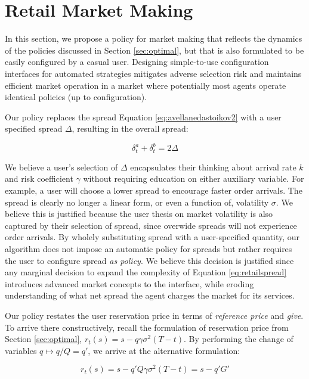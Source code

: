 \documentclass{article}
\begin{document}
\section{Retail Market Making}
\label{sec:retail}

In this section, we propose a policy for market making that reflects the dynamics of the policies discussed in Section \ref{sec:optimal}, but that is also formulated to be easily configured by a casual user. Designing simple-to-use configuration interfaces for automated strategies mitigates adverse selection risk and maintains efficient market operation in a market where potentially most agents operate identical policies (up to configuration).

Our policy replaces the spread Equation \ref{eq:avellanedastoikov2} with a user specified spread $\Delta$, resulting in the overall spread:

\begin{equation}
\label{eq:retailspread}
\delta^a_t + \delta^b_t = 2 \Delta
\end{equation}

We believe a user's selection of $\Delta$ encapsulates their thinking about arrival rate $k$ and risk coefficient $\gamma$ without requiring education on either auxiliary variable. For example, a user will choose a lower spread to encourage faster order arrivals. The spread is clearly no longer a linear form, or even a function of, volatility $\sigma$. We believe this is justified because the user thesis on market volatility is also captured by their selection of spread, since overwide spreads will not experience order arrivals. By wholely substituting spread with a user-specified quantity, our algorithm does not impose an automatic policy for spreads but rather requires the user to configure spread \emph{as policy}. We believe this decision is justified since any marginal decision to expand the complexity of Equation \ref{eq:retailspread} introduces advanced market concepts to the interface, while eroding understanding of what net spread the agent charges the market for its services.

Our policy restates the user reservation price in terms of \emph{reference price} and \emph{give}. To arrive there constructively, recall the formulation of reservation price from Section \ref{sec:optimal}, $r_t(s) = s - q \gamma \sigma^2(T - t)$. By performing the change of variables $q \mapsto q/Q = q'$, we arrive at the alternative formulation:

\begin{equation}
\label{eq:retailprice}
r_t(s) = s - q' Q \gamma \sigma^2(T - t) = s - q' G'
\end{equation}
\end{document}
